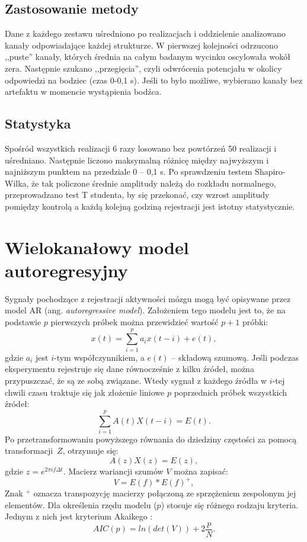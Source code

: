 \documentclass{pracamgr_2}
\begin{document}
\subsection{Zastosowanie metody}\label{sec:zast_pot}
Dane z każdego zestawu uśredniono po realizacjach i oddzielenie analizowano kanały odpowiadające każdej strukturze. W pierwszej kolejności odrzucono ,,puste'' kanały, których średnia na całym badanym wycinku oscylowała wokół zera. Następnie szukano ,,przegięcia'', czyli odwrócenia potencjału w okolicy odpowiedzi na bodziec (czas 0-0,1 s). Jeśli to było możliwe, wybierano kanały bez artefaktu w momencie wystąpienia bodźca.
\subsection{Statystyka}
Spośród wszystkich realizacji 6 razy losowano bez powtórzeń 50 realizacji i uśredniano. Następnie liczono maksymalną różnicę między najwyższym i najniższym punktem na przedziale 0 -- 0,1 s. Po sprawdzeniu testem Shapiro-Wilka, że tak policzone średnie amplitudy należą do rozkładu normalnego, przeprowadzano test T studenta, by się przekonać, czy wzrost amplitudy pomiędzy kontrolą a każdą kolejną godziną rejestracji jest istotny statystycznie.
\newpage
\section{Wielokanałowy model autoregresyjny}
Sygnały pochodzące z rejestracji aktywności mózgu mogą być opisywane przez model AR (ang. \textit{autoregressive model}). Założeniem tego modelu jest to, że na podstawie $p$ pierwszych próbek można przewidzieć wartość $p+1$ próbki:
\begin{equation}
x(t) =  \sum_{i=1}^{p}a_ix(t-i) + e(t),
\end{equation}
gdzie $a_i$ jest $i$-tym współczynnikiem, a $e(t)$ -- składową szumową. \newline
Jeśli podczas eksperymentu rejestruje się dane równocześnie z kilku źródeł, można przypuszczać, że są ze sobą związane. Wtedy sygnał z każdego źródła w $i$-tej chwili czasu traktuje się jak złożenie liniowe $p$ poprzednich próbek wszystkich źródeł:
\begin{equation}
\sum_{i=1}^{p}A(t)X(t-i) = E(t).
\end{equation}
Po przetransformowaniu powyższego równania do dziedziny częstości za pomocą transformacji~$Z$, otrzymuje się:
\begin{equation}
A(z)X(z) = E(z),
\end{equation}
gdzie $z = e^{2\pi if\Delta t}$. Macierz wariancji szumów $V$ można zapisać:
\begin{equation}
V = E(f)*E(f)^{+},
\end{equation}
Znak $^{+}$ oznacza transpozycję macierzy połączoną ze sprzężeniem zespolonym jej elementów.
Dla określenia rzędu modelu ($p$) stosuje się różnego rodzaju kryteria. Jednym z nich jest kryterium Akaikego \citep{jarek}:
\begin{equation}
AIC(p) = ln(det(V))+2\frac{p}{N}.
\end{equation}
\end{document}
